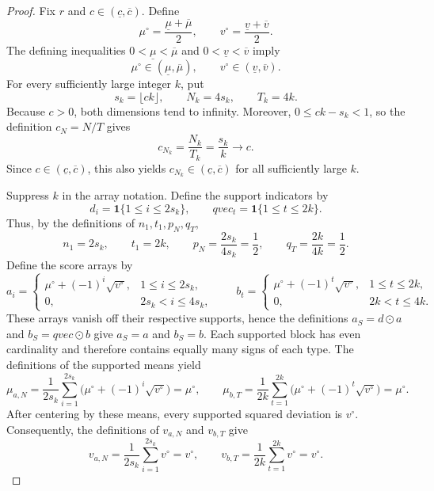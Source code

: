 \documentclass{article}
\begin{document}
\begin{proof}
Fix \(r\) and \(c\in(\underline c,\overline c)\). Define
\[
 \mu^\circ=\frac{\underline\mu+\overline\mu}{2},
 \qquad
 v^\circ=\frac{\underline v+\overline v}{2}.
\]
The defining inequalities \(0<\underline\mu<\overline\mu\) and \(0<\underline v<\overline v\) imply
\[
 \mu^\circ\in(\underline\mu,\overline\mu),
 \qquad
 v^\circ\in(\underline v,\overline v).
\]
For every sufficiently large integer \(k\), put
\[
 s_k=\lfloor ck\rfloor,
 \qquad
 N_k=4s_k,
 \qquad
 T_k=4k.
\]
Because \(c>0\), both dimensions tend to infinity. Moreover, \(0\le ck-s_k<1\), so the definition \(c_N=N/T\) gives
\[
 c_{N_k}=\frac{N_k}{T_k}=\frac{s_k}{k}\longrightarrow c.
\]
Since \(c\in(\underline c,\overline c)\), this also yields \(c_{N_k}\in(\underline c,\overline c)\) for all sufficiently large \(k\).

Suppress \(k\) in the array notation. Define the support indicators by
\[
 d_i=\mathbf 1\{1\le i\le2s_k\},
 \qquad
 qvec_t=\mathbf 1\{1\le t\le2k\}.
\]
Thus, by the definitions of \(n_1,t_1,p_N,q_T\),
\[
 n_1=2s_k,
 \qquad t_1=2k,
 \qquad p_N=\frac{2s_k}{4s_k}=\frac12,
 \qquad q_T=\frac{2k}{4k}=\frac12.
\]
Define the score arrays by
\[
 a_i=
 \begin{cases}
  \mu^\circ+(-1)^i\sqrt{v^\circ},&1\le i\le2s_k,\\
  0,&2s_k<i\le4s_k,
 \end{cases}
 \qquad
 b_t=
 \begin{cases}
  \mu^\circ+(-1)^t\sqrt{v^\circ},&1\le t\le2k,\\
  0,&2k<t\le4k.
 \end{cases}
\]
These arrays vanish off their respective supports, hence the definitions \(a_S=d\odot a\) and \(b_S=qvec\odot b\) give \(a_S=a\) and \(b_S=b\). Each supported block has even cardinality and therefore contains equally many signs of each type. The definitions of the supported means yield
\[
 \mu_{a,N}
 =\frac{1}{2s_k}\sum_{i=1}^{2s_k}
   \bigl(\mu^\circ+(-1)^i\sqrt{v^\circ}\bigr)
 =\mu^\circ,
 \qquad
 \mu_{b,T}
 =\frac{1}{2k}\sum_{t=1}^{2k}
   \bigl(\mu^\circ+(-1)^t\sqrt{v^\circ}\bigr)
 =\mu^\circ.
\]
After centering by these means, every supported squared deviation is \(v^\circ\). Consequently, the definitions of \(v_{a,N}\) and \(v_{b,T}\) give
\[
 v_{a,N}
 =\frac{1}{2s_k}\sum_{i=1}^{2s_k}v^\circ
 =v^\circ,
 \qquad
 v_{b,T}
 =\frac{1}{2k}\sum_{t=1}^{2k}v^\circ
 =v^\circ.
\]


\end{proof}
\end{document}
